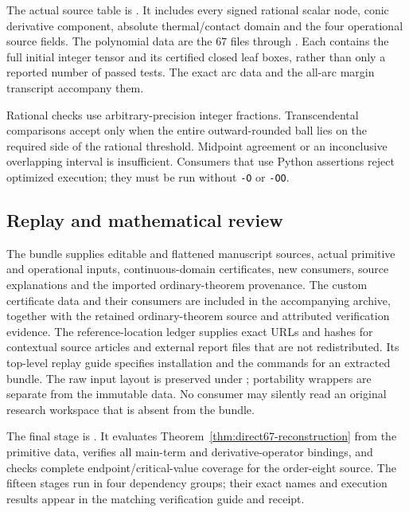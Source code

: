 \documentclass[11pt,a4paper]{article}
\theoremstyle{definition}
\theoremstyle{remark}
\begin{document}
The actual source table is
.
It includes every signed rational scalar node, conic derivative component,
absolute thermal/contact domain and the four operational source fields.
The polynomial data are the $67$ files
 through
.
Each contains the full initial integer tensor and its certified closed
leaf boxes, rather than only a reported number of passed tests.
The exact arc data and the all-arc margin transcript accompany them.

Rational checks use arbitrary-precision integer fractions.
Transcendental comparisons accept only when the entire outward-rounded
ball lies on the required side of the rational threshold. Midpoint
agreement or an inconclusive overlapping interval is insufficient.
Consumers that use Python assertions reject optimized execution; they
must be run without \texttt{-O} or \texttt{-OO}.

\subsection{Replay and mathematical review}\label{ver:replay}

The bundle supplies editable and flattened manuscript sources, actual
primitive and operational inputs, continuous-domain certificates,
new consumers, source explanations and the imported ordinary-theorem
provenance. The custom certificate data and their consumers are included
in the accompanying archive, together with the retained ordinary-theorem
source and attributed verification evidence. The reference-location ledger
supplies exact URLs and hashes for contextual source articles and external
report files that are not redistributed. Its top-level replay guide specifies installation and the
commands for an extracted bundle. The raw input layout is preserved
under ; portability wrappers are separate from the
immutable data. No consumer may silently read an original research
workspace that is absent from the bundle.

The final stage is .
It evaluates Theorem~\ref{thm:direct67-reconstruction} from the primitive
data, verifies all main-term and derivative-operator bindings, and checks
complete endpoint/critical-value coverage for the order-eight source.
The fifteen stages run in four dependency groups; their exact names and
execution results appear in the matching verification guide and receipt.
\end{document}
